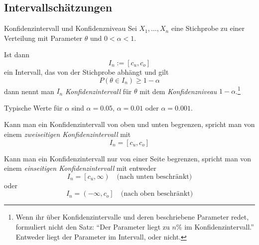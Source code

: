 \subsection{Intervallschätzungen}

\begin{defi}{Konfidenzintervall und Konfidenzniveau}
    Sei $X_1, \ldots, X_n$ eine Stichprobe zu einer Verteilung mit Parameter $\theta$ und $0 < \alpha < 1$.

    Ist dann
    \[
        I_n := [ c_u, c_o ]
    \]
    ein Intervall, das von der Stichprobe abhängt und gilt
    \[
        P( \theta \in I_n ) \geq 1 - \alpha
    \]
    dann nennt man $I_n$ \emph{Konfidenzintervall} für $\theta$ mit dem \emph{Konfidenzniveau} $1 - \alpha$.\footnote{Wenn ihr über Konfidenzintervalle und deren beschriebene Parameter redet, formuliert nicht den Satz: \enquote{Der Parameter liegt zu $n\%$ im Konfidenzintervall.} Entweder liegt der Parameter im Intervall, oder nicht.}

    Typische Werte für $\alpha$ sind $\alpha = 0.05$, $\alpha = 0.01$ oder $\alpha = 0.001$.

    Kann man ein Konfidenzintervall von oben und unten begrenzen, spricht man von einem \emph{zweiseitigen Konfidenzintervall} mit
    \[
        I_n = [ c_u, c_o ]
    \]

    Kann man ein Konfidenzintervall nur von einer Seite begrenzen, spricht man von einem \emph{einseitigen Konfidenzintervall} mit entweder
    \[
        I_n = \left[ c_u, \infty \right) \quad \text{(nach unten beschränkt)}
            \]
            oder
            \[
            I_n = \left( -\infty, c_o \right] \quad \text{(nach oben beschränkt)}
    \]
\end{defi}


